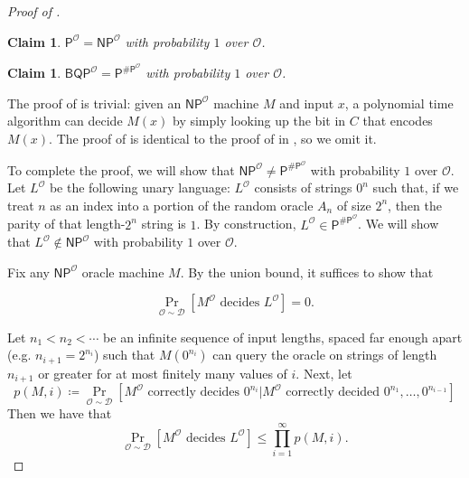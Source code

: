 \documentclass[10pt,a4paper]{article}
\newtheorem{claim}[theorem]{Claim}
\begin{document}
\begin{proof}[Proof of ]
\begin{claim}
\label{claim:p=np}
$\mathsf{P}^\mathcal{O} = \mathsf{NP}^\mathcal{O}$ with probability $1$ over $\mathcal{O}$.
\end{claim}

\begin{claim}
\label{claim:bqp=pp}
$\mathsf{BQP}^\mathcal{O} = \mathsf{P}^{\mathsf{\# P}^\mathcal{O}}$ with probability $1$ over $\mathcal{O}$.
\end{claim}

The proof of  is trivial: given an $\mathsf{NP}^\mathcal{O}$ machine $M$ and input $x$, a polynomial time algorithm can decide $M(x)$ by simply looking up the bit in $C$ that encodes $M(x)$. The proof of  is identical to the proof of  in , so we omit it.

To complete the proof, we will show that $\mathsf{NP}^\mathcal{O} \neq \mathsf{P}^{\mathsf{\# P}^\mathcal{O}}$ with probability $1$ over $\mathcal{O}$. Let $L^\mathcal{O}$ be the following unary language: $L^\mathcal{O}$ consists of strings $0^n$ such that, if we treat $n$ as an index into a portion of the random oracle $A_n$ of size $2^n$, then the parity of that length-$2^n$ string is $1$. By construction, $L^\mathcal{O} \in \mathsf{P}^{\mathsf{\# P}^\mathcal{O}}$. We will show that $L^\mathcal{O} \not\in \mathsf{NP}^\mathcal{O}$ with probability $1$ over $\mathcal{O}$.

Fix any $\mathsf{NP}^{\mathcal{O}}$ oracle machine $M$. By the union bound, it suffices to show that

\[
\Pr_{\mathcal{O}\sim\mathcal{D}}\left[M^\mathcal{O} \text{ decides } L^\mathcal{O}\right]=0.
\]

Let $n_1<n_2<\cdots$ be an infinite sequence of input lengths, spaced far enough apart (e.g. $n_{i+1}=2^{n_i}$) such that $M\left(0^{n_i}\right)$ can query the oracle on strings of length $n_{i+1}$ or greater for at most finitely many values of $i$. Next, let
\[
p(M,i)\coloneqq\Pr_{\mathcal{O}\sim\mathcal{D}}\left[M^\mathcal{O} \text{ correctly decides } 0^{n_i}|M^\mathcal{O} \text{ correctly decided }0^{n_1},\dots,0^{n_{i-1}}\right]
\]
Then we have that
\[
\Pr_{\mathcal{O}\sim\mathcal{D}}\left[M^\mathcal{O}\text{ decides }L^\mathcal{O}\right]\leq\prod_{i=1}^\infty p(M,i).
\]


\end{proof}
\end{document}
